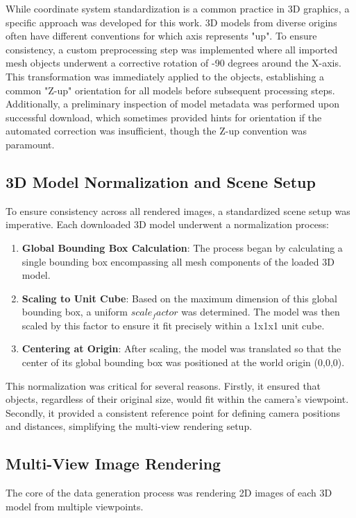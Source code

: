 While coordinate system standardization is a common practice in 3D graphics, a specific approach was developed for this work. 3D models from diverse origins often have different conventions for which axis represents "up". To ensure consistency, a custom preprocessing step was implemented where all imported mesh objects underwent a corrective rotation of -90 degrees around the X-axis. This transformation was immediately applied to the objects, establishing a common "Z-up" orientation for all models before subsequent processing steps. Additionally, a preliminary inspection of model metadata was performed upon successful download, which sometimes provided hints for orientation if the automated correction was insufficient, though the Z-up convention was paramount.

\subsection{3D Model Normalization and Scene Setup}\label{ssec:model-normalization}
To ensure consistency across all rendered images, a standardized scene setup was imperative. Each downloaded 3D model underwent a normalization process:
\begin{enumerate}
  \item \textbf{Global Bounding Box Calculation}: The process began by calculating a single bounding box encompassing all mesh components of the loaded 3D model.
  \item \textbf{Scaling to Unit Cube}: Based on the maximum dimension of this global bounding box, a uniform $scale_factor$ was determined. The model was then scaled by this factor to ensure it fit precisely within a 1x1x1 unit cube.
  \item \textbf{Centering at Origin}: After scaling, the model was translated so that the center of its global bounding box was positioned at the world origin (0,0,0).
\end{enumerate}
This normalization was critical for several reasons. Firstly, it ensured that objects, regardless of their original size, would fit within the camera's viewpoint. Secondly, it provided a consistent reference point for defining camera positions and distances, simplifying the multi-view rendering setup.

\subsection{Multi-View Image Rendering}\label{ssec:multi-view-rendering}
The core of the data generation process was rendering 2D images of each 3D model from multiple viewpoints.


